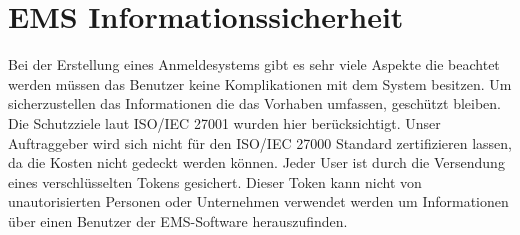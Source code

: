 \section{EMS Informationssicherheit}
Bei der Erstellung eines Anmeldesystems gibt es sehr viele Aspekte die beachtet werden müssen das Benutzer keine Komplikationen mit dem System besitzen. Um sicherzustellen das Informationen die das Vorhaben umfassen, geschützt bleiben. Die Schutzziele laut ISO/IEC 27001 wurden hier berücksichtigt. Unser Auftraggeber wird sich nicht für den ISO/IEC 27000 Standard zertifizieren lassen, da die Kosten nicht gedeckt werden können.
Jeder User ist durch die Versendung eines verschlüsselten Tokens gesichert. Dieser Token kann nicht von unautorisierten Personen oder Unternehmen verwendet werden um Informationen über einen Benutzer der EMS-Software herauszufinden. 


\newpage